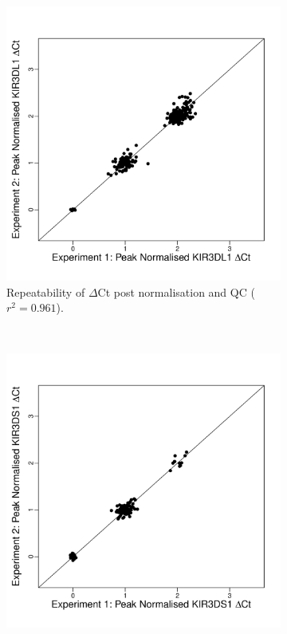 \begin{figure}[h]
    \centering
    \begin{subfigure}[b]{.4\textwidth}
        \includegraphics[scale=.4] {figures/DL1-repeatability.pdf}
        \caption{Repeatability of  $\Delta$Ct post normalisation and QC ($r^{2}=0.961$).}
    \end{subfigure}
    ~
    \begin{subfigure}[b]{.4\textwidth}
        \includegraphics[scale=.4] {figures/DS1-repeatability.pdf}

\end{subfigure}
\end{figure}

